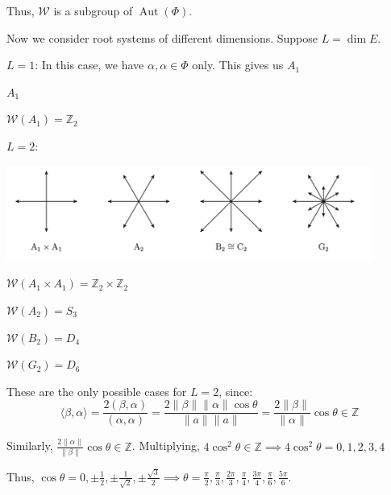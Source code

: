 \documentclass{article}
\theoremstyle{definition}
\begin{document}
Thus, \(\mathcal{W}\) is a subgroup of \(\operatorname{Aut} (\Phi )\).

Now we consider root systems of different dimensions. Suppose \(L = \dim E\).

\underline{\(L = 1\)}: In this case, we have \(\alpha ,\alpha \in \Phi \) only. This gives us \(A_1\) 

\begin{center}

    \(A_1\) 
\end{center}

\(\mathcal{W} (A_1) = \mathbb{Z}_2\) 

\underline{\(L = 2\)}:

\begin{center}
    \includegraphics[width=0.9\textwidth]{img/root_systems}
\end{center}

\(\mathcal{W}(A_1 \times A_1) = \mathbb{Z}_2 \times \mathbb{Z}_2\) 

\(\mathcal{W} (A_2) = S_3\) 

\(\mathcal{W}(B_2) = D_4\) 

\(\mathcal{W}(G_2) = D_6\) 

These are the only possible cases for \(L=2\), since:
\[
    \langle \beta , \alpha  \rangle = \frac{2(\beta,\alpha)}{(\alpha,\alpha)} = \frac{2 \lVert \beta  \rVert \lVert \alpha  \rVert \cos \theta}{\lVert a \rVert \lVert a \rVert } = \frac{2 \lVert \beta  \rVert}{\lVert \alpha  \rVert} \cos \theta \in \mathbb{Z}
\]

Similarly, \(\frac{2 \lVert \alpha \rVert }{\lVert \beta  \rVert }\cos \theta \in \mathbb{Z}\). Multiplying, \(4 \cos^2 \theta \in \mathbb{Z} \implies 4\cos^2\theta = 0,1,2,3,4 \)

Thus, \(\cos \theta = 0, \pm\frac{1}{2}, \pm\frac{1}{\sqrt{2}}, \pm\frac{\sqrt{3}}{2} \implies \theta = \frac{\pi}{2}, \frac{\pi}{3}, \frac{2\pi}{3}, \frac{\pi}{4}, \frac{3\pi}{4}, \frac{\pi}{6}, \frac{5\pi}{6}\).
\end{document}

